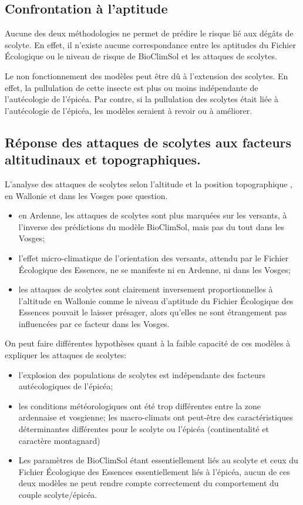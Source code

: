 \subsection{Confrontation à l'aptitude}
Aucune des deux méthodologies ne permet de prédire le risque lié aux dégâts de scolyte. En effet, il n'existe aucune correspondance entre les aptitudes du Fichier Écologique ou  le niveau de risque de BioClimSol et les attaques de scolytes.

Le non fonctionnement des modèles peut être dû à l'extension des scolytes. En effet, la pullulation de cette insecte est plus ou moins indépendante de l'autécologie de l'épicéa. 
Par contre, si la pullulation des scolytes était liée à l'autécologie de l'épicéa, les modèles seraient à revoir ou à améliorer.

\subsection{Réponse des attaques de scolytes aux facteurs altitudinaux et topographiques.}

L'analyse des attaques de scolytes selon l'altitude et la position topographique , en Wallonie et dans les Vosges pose question.
\begin{itemize}
	\item en Ardenne, les attaques de scolytes sont plus marquées sur les versants, à l'inverse des prédictions du modèle BioClimSol, mais pas du tout dans les Vosges;
	
	\item l'effet micro-climatique de l'orientation des versants, attendu par le Fichier Écologique des Essences, ne se manifeste ni en Ardenne, ni dans les Vosges;
	
	\item les attaques de scolytes sont clairement inversement proportionnelles à l'altitude en Wallonie comme le niveau d'aptitude du Fichier Écologique des Essences pouvait le laisser présager, alors qu'elles ne sont étrangement pas influencées par ce facteur dans les Vosges.
	
\end{itemize}
On peut faire différentes hypothèses quant à la faible capacité de ces modèles à expliquer les attaques de scolytes:

\begin{itemize}
	\item l'explosion des populations de scolytes est indépendante des facteurs autécologiques de l'épicéa;
	\item les conditions météorologiques ont été trop différentes entre la zone ardennaise et vosgienne; les macro-climats ont peut-être des caractéristiques déterminantes différentes pour le scolyte ou l'épicéa (continentalité et caractère montagnard)
	\item Les paramètres de BioClimSol étant essentiellement liés au scolyte et ceux du Fichier Écologique des Essences essentiellement liés à l'épicéa, aucun de ces deux modèles ne peut rendre compte correctement du comportement du couple    scolyte/épicéa.
\end{itemize}



